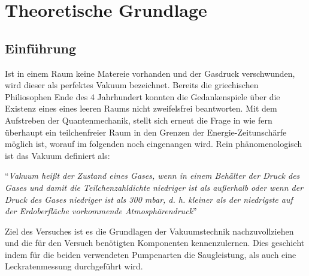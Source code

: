 \section{Theoretische Grundlage}
\label{sec:Theorie}

\subsection{Einführung}
Ist in einem Raum keine Matereie vorhanden und der Gasdruck verschwunden, wird dieser als perfektes Vakuum bezeichnet. Bereits die griechischen Philiosophen Ende des 4 Jahrhundert konnten die Gedankenspiele über die Existenz eines eines leeren Raums nicht zweifelsfrei beantworten. Mit dem Aufstreben der Quantenmechanik, stellt sich erneut die Frage in wie fern überhaupt ein teilchenfreier Raum in den Grenzen der Energie-Zeitunschärfe möglich ist, worauf im folgenden noch eingenangen wird. Rein phänomenologisch ist das Vakuum definiert als:

``\textit{Vakuum heißt der Zustand eines Gases, wenn in einem Behälter der Druck des Gases und damit die Teilchenzahldichte niedriger ist als außerhalb oder wenn der Druck des Gases niedriger ist als 300 mbar, d. h. kleiner als der niedrigste auf der Erdoberfläche vorkommende Atmosphärendruck}'' \cite{DIN}

Ziel des Versuches ist es die Grundlagen der Vakuumstechnik nachzuvollziehen und die für den Versuch benötigten Komponenten kennenzulernen. Dies geschieht indem für die beiden verwendeten Pumpenarten die Saugleistung, als auch eine Leckratenmessung durchgeführt wird.

